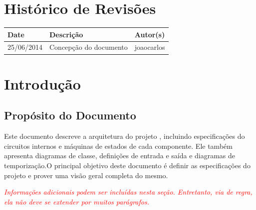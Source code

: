 \documentclass{report}
\begin{document}
\capa
%

\chapter*{Histórico de Revisões}
  \vspace*{1cm}
  \begin{table}[ht]
    \centering
    \begin{tabular}[pos]{|m{2cm} | m{8cm} | m{4cm}|} 
      \hline
      \cellcolor[gray]{0.9}
      \textbf{Date} & \cellcolor[gray]{0.9}\textbf{Descrição} & \cellcolor[gray]{0.9}\textbf{Autor(s)}\\
      \hline
      25/06/2014 &  Concepção do documento & joaocarlos \\ \hline
    \end{tabular}
  \end{table}

\tableofcontents

\chapter{Introdução}
  
  \section{Propósito do Documento}
  Este documento descreve a arquitetura do projeto \ipPROCESSProject, incluindo especificações do circuitos internos e máquinas de estados de cada componente. Ele também apresenta diagramas de classe, definições de entrada e saída e diagramas de temporização.O principal objetivo deste documento é definir as especificações do projeto \ipPROCESSProject e prover uma visão geral completa do mesmo.

  \noindent \textcolor{red}{\textit{Informações adicionais podem ser incluídas nesta seção. Entretanto, via de regra, ela não deve se extender por muitos parágrafos.}}
\end{document}
